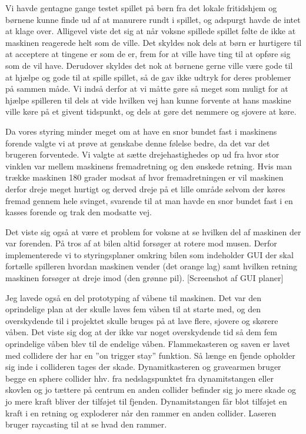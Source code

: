 Vi havde gentagne gange testet spillet på børn fra det lokale fritidshjem og børnene kunne finde ud af at manurere rundt i spillet, og adspurgt havde de intet at klage over. Alligevel viste det sig at når voksne spillede spillet følte de ikke at maskinen reagerede helt som de ville. Det skyldes nok dels at børn er hurtigere til at acceptere at tingene er som de er, frem for at ville have ting til at opføre sig som de vil have. Derudover skyldes det nok at børnene gerne ville være gode til at hjælpe og gode til at spille spillet, så de gav ikke udtryk for deres problemer på sammen måde. Vi indså derfor at vi måtte gøre så meget som muligt for at hjælpe spilleren til dels at vide hvilken vej han kunne forvente at hans maskine ville køre på et givent tidspunkt, og dels at gøre det nemmere og sjovere at køre.

Da vores styring minder meget om at have en snor bundet fast i maskinens forende valgte vi at prøve at genskabe denne følelse bedre, da det var det brugeren forventede. Vi valgte at sætte drejehastighedes op ud fra hvor stor vinklen var mellem maskinens fremadretning og den ønskede retning. Hvis man trække maskinen 180 grader modsat af hvor fremadretningen er vil maskinen derfor dreje meget hurtigt og derved dreje på et lille område selvom der køres fremad gennem hele svinget, svarende til at man havde en snor bundet fast i en kasses forende og trak den modsatte vej. 

Det viste sig også at være et problem for voksne at se hvilken del af maskinen der var forenden. På tros af at bilen altid forsøger at rotere mod musen. Derfor implementerede vi to styringsplaner omkring bilen som indeholder GUI der skal fortælle spilleren hvordan maskinen vender (det orange lag) samt hvilken retning maskinen forsøger at dreje imod (den grønne pil).
[Screenshot af GUI planer]

Jeg lavede også en del prototyping af våbene til maskinen. Det var den oprindelige plan at der skulle laves fem våben til at starte med, og den overskydende til i projektet skulle bruges på at lave flere, sjovere og skørere våben. Det viste sig dog at der ikke var noget overskydende tid så dem fem oprindelige våben blev til de endelige våben. Flammekasteren og saven er lavet med collidere der har en ''on trigger stay'' funktion. Så længe en fjende opholder sig inde i collideren tages der skade. Dynamitkasteren og gravearmen bruger begge en sphere collider hhv. fra nedslagspunktet fra dynamitstangen eller skovlen og jo tættere på centrum en anden collider befinder sig jo mere skade og jo mere kraft bliver der tilføjet til fjenden. Dynamitstangen får blot tilføjet en kraft i en retning og exploderer når den rammer en anden collider. Laseren bruger raycasting til at se hvad den rammer.

